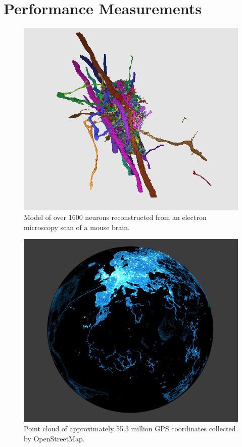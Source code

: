 \documentclass{vgtc}                          %
\begin{document}
\section{Performance Measurements}
\begin{figure}[tb]
 \centering
 \includegraphics[width=\columnwidth]{figures/neurons_placeholder.png}
 \caption{Model of over 1600 neurons reconstructed from an electron microscopy scan of a mouse brain.}
 \label{fig:neurons}
\end{figure}

\begin{figure}[tb]
 \centering
 \includegraphics[width=\columnwidth]{figures/gps_55.3M.png}
 \caption{Point cloud of approximately 55.3 million GPS coordinates collected by OpenStreetMap.}
 \label{fig:gps}
\end{figure}
\end{document}
